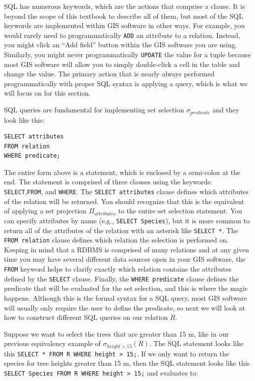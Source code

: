\documentclass[
]{book}
\begin{document}
SQL has numerous keywords, which are the actions that comprise a clause. It is beyond the scope of this textbook to describe all of them, but most of the SQL keywords are implemented within GIS software in other ways. For example, you would rarely need to programmatically \texttt{ADD} an attribute to a relation. Instead, you might click an ``Add field'' button within the GIS software you are using. Similarly, you might never programmatically \texttt{UPDATE} the value for a tuple because most GIS software will allow you to simply double-click a cell in the table and change the value. The primary action that is nearly always performed programmatically with proper SQL syntax is applying a query, which is what we will focus on for this section.

SQL queries are fundamental for implementing set selection \(σ_{predicate}\) and they look like this:

\begin{verbatim}
SELECT attributes
FROM relation
WHERE predicate;
\end{verbatim}

The entire form above is a statement, which is enclosed by a semi-colon at the end. The statement is comprised of three clauses using the keywords: \texttt{SELECT},\texttt{FROM}, and \texttt{WHERE}. The \texttt{SELECT\ attributes} clause defines which attributes of the relation will be returned. You should recognize that this is the equivalent of applying a set projection \(Π_{attributes}\) to the entire set selection statement. You can specify attributes by name (e.g., \texttt{SELECT\ Species}), but it is more common to return all of the attributes of the relation with an asterisk like \texttt{SELECT\ *}. The \texttt{FROM\ relation} clause defines which relation the selection is performed on. Keeping in mind that a RDBMS is comprised of many relations and at any given time you may have several different data sources open in your GIS software, the \texttt{FROM} keyword helps to clarify exactly which relation contains the attributes defined by the \texttt{SELECT} clause. Finally, the \texttt{WHERE\ predicate} clause defines the predicate that will be evaluated for the set selection, and this is where the magic happens. Although this is the formal syntax for a SQL query, most GIS software will usually only require the user to define the predicate, so next we will look at how to construct different SQL queries on our relation \(R\).

Suppose we want to select the trees that are greater than 15 m, like in our previous equivalency example of \(σ_{height>15}(R)\). The SQL statement looks like this \texttt{SELECT\ *\ FROM\ R\ WHERE\ height\ \textgreater{}\ 15;}. If we only want to return the species for tree heights greater than 15 m, then the SQL statement looks like this \texttt{SELECT\ Species\ FROM\ R\ WHERE\ height\ \textgreater{}\ 15;} and evaluates to:
\end{document}
